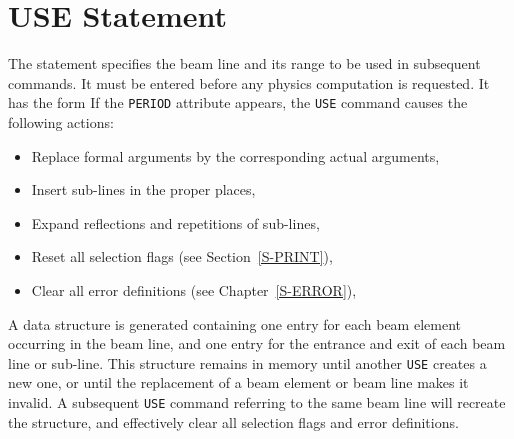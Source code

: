 \section{USE Statement}
\label{S-USE}
The  statement specifies the beam line and its range
to be used in subsequent commands.
It must be entered before any physics computation is requested.
It has the form
If the {\tt PERIOD} attribute appears,
the {\tt USE} command causes the following actions:
\begin{itemize}
\item Replace formal arguments by the corresponding actual arguments,
\item Insert sub-lines in the proper places,
\item Expand reflections and repetitions of sub-lines,
\item Reset all selection flags (see Section~\ref{S-PRINT}),
\item Clear all error definitions (see Chapter~\ref{S-ERROR}),
\end{itemize}
A data structure is generated containing
one entry for each beam element occurring in the beam line,
and one entry for the entrance and exit of each beam line or sub-line.
This structure remains in memory until another {\tt USE}
creates a new one,
or until the replacement of a beam element or beam line
makes it invalid.
A subsequent {\tt USE} command referring to the same beam line will
recreate the structure,
and effectively clear all selection flags and error definitions.
 

